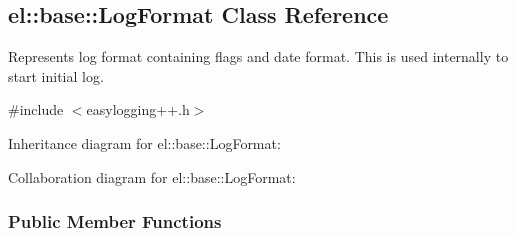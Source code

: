 \hypertarget{a00046}{}\subsection{el\+:\+:base\+:\+:Log\+Format Class Reference}
\label{a00046}


Represents log format containing flags and date format. This is used internally to start initial log.  




{\ttfamily \#include $<$easylogging++.\+h$>$}



Inheritance diagram for el\+:\+:base\+:\+:Log\+Format\+:


Collaboration diagram for el\+:\+:base\+:\+:Log\+Format\+:
\subsubsection*{Public Member Functions}
